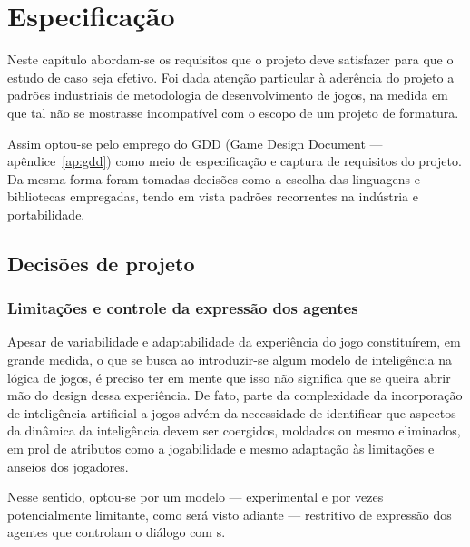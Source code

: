 \chapter{Especificação}


Neste capítulo abordam-se os requisitos que o projeto deve satisfazer para que o estudo de caso seja efetivo. Foi dada atenção particular à aderência do projeto a padrões industriais de metodologia de desenvolvimento de jogos, na medida em que tal não se mostrasse incompatível com o escopo de um projeto de formatura. 

Assim optou-se pelo emprego do GDD (Game Design Document --- apêndice~\ref{ap:gdd}) como meio de especificação e captura de requisitos do projeto. Da mesma forma foram tomadas decisões como a escolha das linguagens e bibliotecas empregadas, tendo em vista padrões recorrentes na indústria e portabilidade.

\section{Decisões de projeto}

\subsection{Limitações e controle da expressão dos agentes}

Apesar de variabilidade e adaptabilidade da experiência do jogo
constituírem, em grande medida, o que se busca ao introduzir-se algum
modelo de inteligência na lógica de jogos, é preciso ter em mente que
isso não significa que se queira abrir mão do design dessa
experiência. De fato, parte da complexidade da incorporação de
inteligência artificial a jogos advém da necessidade de identificar
que aspectos da dinâmica da inteligência devem ser coergidos, moldados
ou mesmo eliminados, em prol de atributos como a jogabilidade e mesmo
adaptação às limitações e anseios dos jogadores.

Nesse sentido, optou-se por um modelo --- experimental e
por vezes potencialmente limitante, como será visto adiante ---
restritivo de expressão dos agentes que controlam o diálogo com
\npc{}s.

